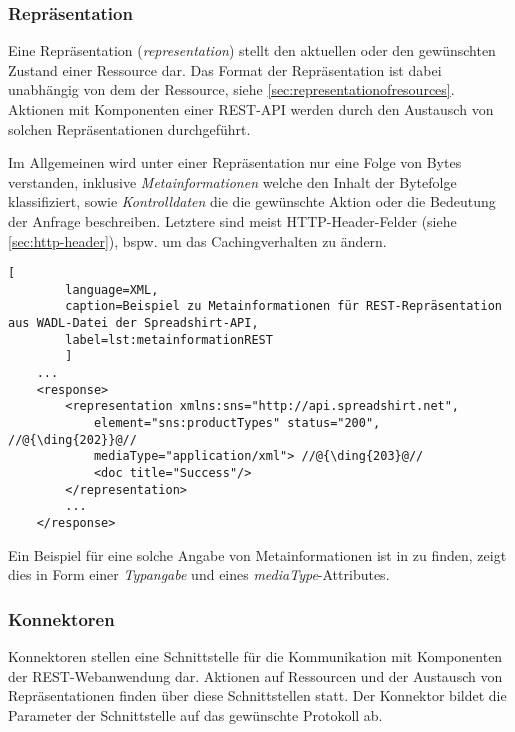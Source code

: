 \subsubsection{Repräsentation}

Eine Repräsentation (\emph{representation}) stellt den aktuellen oder den gewünschten Zustand einer Ressource dar. Das Format der Repräsentation ist dabei unabhängig von dem der Ressource, siehe \cref{sec:representationofresources}.
Aktionen mit Komponenten einer REST-API werden durch den Austausch von solchen Repräsentationen durchgeführt.

Im Allgemeinen wird unter einer Repräsentation nur eine Folge von Bytes verstanden, inklusive \emph{Metainformationen} welche den Inhalt der Bytefolge klassifiziert, sowie \emph{Kontrolldaten} die die gewünschte Aktion oder die Bedeutung der Anfrage beschreiben. Letztere sind meist HTTP-Header-Felder (siehe \cref{sec:http-header}), bspw. um das Cachingverhalten zu ändern.

\begin{minipage}{\textwidth}
    \begin{lstlisting}[
        language=XML,
        caption=Beispiel zu Metainformationen für REST-Repräsentation aus WADL-Datei der Spreadshirt-API,
        label=lst:metainformationREST
        ]
    ...
    <response>
        <representation xmlns:sns="http://api.spreadshirt.net",
            element="sns:productTypes" status="200", //@{\ding{202}}@//
            mediaType="application/xml"> //@{\ding{203}@//
            <doc title="Success"/>
        </representation>
        ...
    </response>
    \end{lstlisting}
\end{minipage}

Ein Beispiel für eine solche Angabe von Metainformationen ist in  zu finden,  zeigt dies in Form einer \emph{Typangabe} und  eines \emph{mediaType}-Attributes.

\subsubsection{Konnektoren}

Konnektoren stellen eine Schnittstelle für die Kommunikation mit Komponenten der REST-Webanwendung dar. Aktionen auf Ressourcen und der Austausch von Repräsentationen finden über diese Schnittstellen statt. Der Konnektor bildet die Parameter der Schnittstelle auf das gewünschte Protokoll ab.

